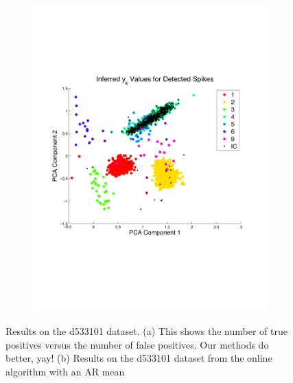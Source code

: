 \documentclass{article} %
\begin{document}
\begin{center}
\begin{figure}
\begin{subfigure}[b]{.5\textwidth}
\includegraphics[width=\textwidth]{../figs/ykarreduced}
\caption{}
\label{pcaonlinear}
\end{subfigure}
\caption{Results on the d533101 dataset.  (a) This shows the number of true positives versus the number of false positives.  Our methods do better, yay! (b) Results on the d533101 dataset from the online algorithm with an AR mean}
\end{figure}
\end{center}
\end{document}
